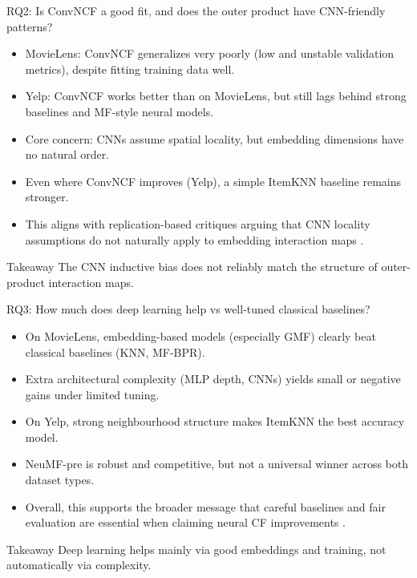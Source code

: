 \documentclass[aspectratio=169,11pt]{beamer}
\begin{document}
\begin{frame}{RQ2: Is ConvNCF a good fit, and does the outer product have CNN-friendly patterns?}
\begin{itemize}
  \item MovieLens: ConvNCF generalizes very poorly (low and unstable validation metrics), despite fitting training data well.
  \item Yelp: ConvNCF works better than on MovieLens, but still lags behind strong baselines and MF-style neural models.
  \item Core concern: CNNs assume spatial locality, but embedding dimensions have no natural order.
  \item Even where ConvNCF improves (Yelp), a simple ItemKNN baseline remains stronger.
  \item This aligns with replication-based critiques arguing that CNN locality assumptions do not naturally apply to embedding interaction maps \cite{anelli2021reenvisioning}.
\end{itemize}

\medgap
\begin{block}{Takeaway}
The CNN inductive bias does not reliably match the structure of outer-product interaction maps.
\end{block}
\end{frame}


\begin{frame}{RQ3: How much does deep learning help vs well-tuned classical baselines?}
\begin{itemize}
  \item On MovieLens, embedding-based models (especially GMF) clearly beat classical baselines (KNN, MF-BPR).
  \item Extra architectural complexity (MLP depth, CNNs) yields small or negative gains under limited tuning.
  \item On Yelp, strong neighbourhood structure makes ItemKNN the best accuracy model.
  \item NeuMF-pre is robust and competitive, but not a universal winner across both dataset types.
  \item Overall, this supports the broader message that careful baselines and fair evaluation are essential when claiming neural CF improvements \cite{rendle2020neural,anelli2021reenvisioning}.
\end{itemize}

\medgap
\begin{block}{Takeaway}
Deep learning helps mainly via good embeddings and training, not automatically via complexity.
\end{block}
\end{frame}
\end{document}
